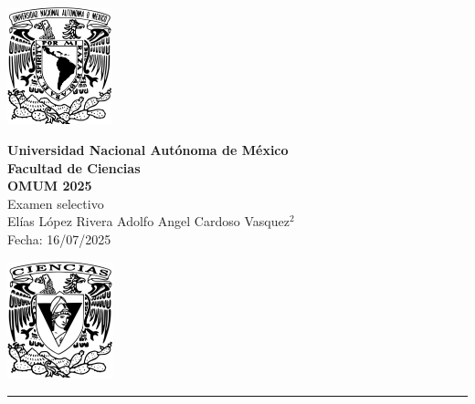 \documentclass[11pt,letterpaper]{article}
\begin{document}

\begin{center}
    \begin{minipage}{3cm}
    	\begin{center}
    		\includegraphics[height=3.4cm]{logo_unam.png}
    	\end{center}
    \end{minipage}\hfill
    \begin{minipage}{10cm}
    	\begin{center}
    	\textbf{\large Universidad Nacional Autónoma de México}\\[0.1cm]
        \textbf{Facultad de Ciencias}\\[0.1cm]
        \textbf{OMUM 2025}\\[0.1cm]
        Examen selectivo\\[0.1cm]
         El\'ias L\'opez Rivera\,\,Adolfo Angel Cardoso Vasquez$^{2}$\\[0.1cm]
        Fecha:\,\,16/07/2025
    	\end{center}
    \end{minipage}\hfill
    \begin{minipage}{3cm}
    	\begin{center}
    		\includegraphics[height=3.4cm]{Logo_FC.png}
    	\end{center}
    \end{minipage}
\end{center}

\rule{17cm}{0.1mm}
\end{document}
